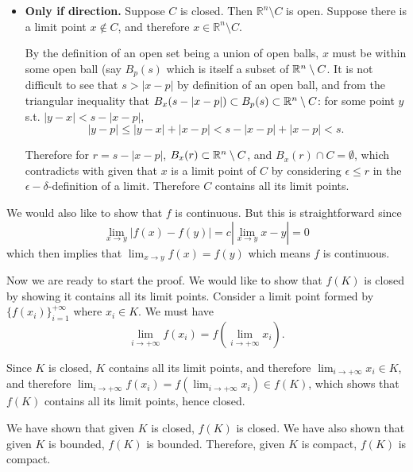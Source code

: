 \begin{itemize}
\begin{itemize}
        \item \textbf{Only if direction.} Suppose \(C\) is closed. Then \(\mathbb{R}^n \setminus C\) is open. Suppose there is a limit point \(x \notin C\), and therefore \(x \in \mathbb{R}^n \setminus C\).

        By the definition of an open set being a union of open balls, \(x\) must be within some open ball (say \(B_p(s)\) which is itself a subset of \(\mathbb{R}^n \setminus C\). It is not difficult to see that \(s > |x - p|\) by definition of an open ball, and from the triangular inequality that \(B_x(s - |x - p|) \subset B_p(s) \subset \mathbb{R}^n \setminus C\): for some point \(y\) s.t. \(|y - x| < s - |x - p|\),
        \[|y - p| \leq |y - x| + |x - p| < s - |x - p| + |x - p| < s.\]
    
        Therefore for \(r = s - |x - p|\), \(B_x(r) \subset \mathbb{R}^n \setminus C\), and \(B_x(r) \cap C = \emptyset\), which contradicts with given that \(x\) is a limit point of \(C\) by considering \(\epsilon \leq r\) in the \(\epsilon-\delta\)-definition of a limit. Therefore \(C\) contains all its limit points.
    \end{itemize}

    We would also like to show that \(f\) is continuous. But this is straightforward since
    \[
        \lim_{x \to y} |f(x) - f(y)| = c |\lim_{x \to y} x - y| = 0
    \]
    which then implies that \(\lim_{x \to y} f(x) = f(y)\) which means \(f\) is continuous.

    Now we are ready to start the proof. We would like to show that \(f(K)\) is closed by showing it contains all its limit points. Consider a limit point formed by \(\{f(x_i)\}_{i = 1}^{+\infty}\) where \(x_i \in K\). We must have
    \[
        \lim_{i \to +\infty} f(x_i) = f\left(\lim_{i \to +\infty}x_i\right).
    \]

    Since \(K\) is closed, \(K\) contains all its limit points, and therefore \(\lim_{i \to +\infty}x_i \in K\), and therefore \(\lim_{i \to +\infty} f(x_i) = f\left(\lim_{i \to +\infty}x_i\right) \in f(K)\), which shows that \(f(K)\) contains all its limit points, hence closed.
\end{itemize}

We have shown that given \(K\) is closed, \(f(K)\) is closed. We have also shown that given \(K\) is bounded, \(f(K)\) is bounded. Therefore, given \(K\) is compact, \(f(K)\) is compact.